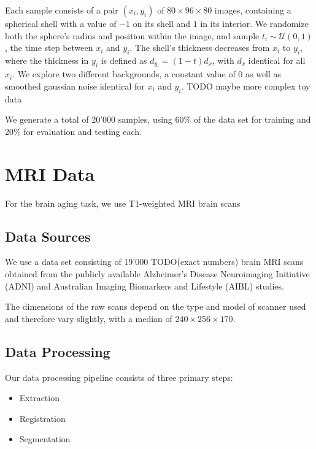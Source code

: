 Each sample consists of a pair $(x_i, y_i)$ of $ 80 \times 96 \times 80 $ images, containing a spherical shell with a value of $-1$ on its shell and $1$ in its interior. We randomize both the sphere's radius and position within the image, and sample $t_i \sim \mathcal{U}(0, 1)$, the time step between $x_i$ and $y_i$. The shell's thickness decreases from $x_i$ to $y_i$, where the thickness in $y_i$ is defined as $d_{y_i} = (1-t) d_x$, with $d_x$ identical for all $x_i$. We explore two different backgrounds, a constant value of 0 as well as smoothed gaussian noise identical for $x_i$ and $y_i$. TODO maybe more complex toy data

We generate a total of 20'000 samples, using 60\% of the data set for training and 20\% for evaluation and testing each.

\section{MRI Data}
For the brain aging task, we use T1-weighted MRI brain scans

\subsection{Data Sources}
We use a data set consisting of 19'000 TODO(exact numbers) brain MRI scans obtained from the publicly available Alzheimer's Disease Neuroimaging Initiative (ADNI) \cite{ADNI} and Australian Imaging Biomarkers and Lifestyle (AIBL) \cite{AIBL} studies.

The dimensions of the raw scans depend on the type and model of scanner used and therefore vary slightly, with a median of $ 240 \times 256 \times 170 $. 

\subsection{Data Processing}
Our data processing pipeline consists of three primary steps:

\begin{itemize}
\item Extraction
\item Registration
\item Segmentation
\end{itemize}

